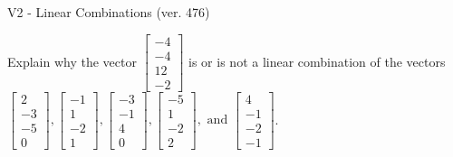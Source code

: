 \begin{exercise}
  \begin{exerciseTitle}V2 - Linear Combinations (ver. 476)\end{exerciseTitle}
  \begin{exerciseStatement}
    Explain why the vector \(\left[\begin{array}{c}
-4 \\
-4 \\
12 \\
-2
\end{array}\right]\)  is or is not a linear 
	combination of the vectors \(\left[\begin{array}{c}
2 \\
-3 \\
-5 \\
0
\end{array}\right] , \left[\begin{array}{c}
-1 \\
1 \\
-2 \\
1
\end{array}\right] , \left[\begin{array}{c}
-3 \\
-1 \\
4 \\
0
\end{array}\right] , \left[\begin{array}{c}
-5 \\
1 \\
-2 \\
2
\end{array}\right] , \text{ and } \left[\begin{array}{c}
4 \\
-1 \\
-2 \\
-1
\end{array}\right]\).
	



\end{exerciseStatement}
\end{exercise}
